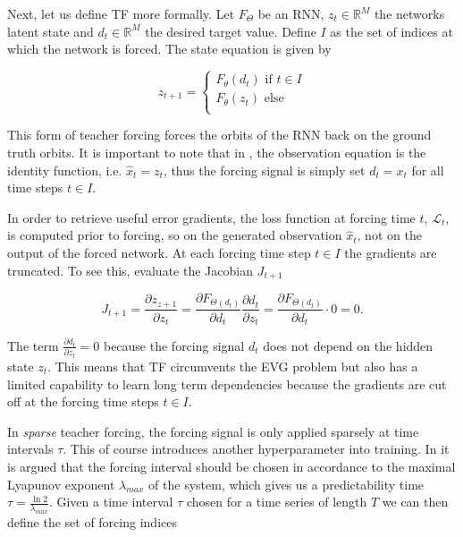 Next, let us define TF more formally. Let $F_{\Theta}$ be an RNN, $z_{t} \in \mathbb{R}^M$ the networks latent state and $d_t \in \mathbb{R}^M$ the desired 
target value. Define $I$ as the set of indices at which the network is forced. The state equation is given by

\begin{equation}
    z_{t+1} = \begin{cases}
        F_{\theta}(d_t) \text{ if } t \in I \\
        F_{\theta}(z_t) \text{ else }\\
    \end{cases}
    \label{eq:teacher_forcing}
\end{equation}

This form of teacher forcing forces the orbits of the RNN back on the ground truth orbits. It is important to note that in \cite{williams1989learning}, 
the observation equation is the identity function, i.e. $\hat{x}_t = z_t$, thus the forcing signal is simply set $d_t = x_t$ for all time steps $t \in I$. 

In order to retrieve useful error gradients, the loss function at forcing time $t$, $\mathcal{L}_t$, is computed prior to forcing,
so on the generated observation $\hat{x}_t$, not on the output of the forced network. At each forcing time step $t \in I$ the gradients are truncated.
To see this, evaluate the Jacobian $J_{t+1}$

\begin{equation}
    J_{t+1} = \frac{\partial z_{z+1}}{\partial z_{t}} = \frac{\partial F_{\Theta (d_t)}}{\partial d_t} \frac{\partial d_t}{\partial z_t} = \frac{\partial F_{\Theta (d_t)}}{\partial d_t} \cdot 0 = 0.
\end{equation}

The term $\frac{\partial d_t}{\partial z_t} = 0$ because the forcing signal $d_t$ does not depend on the hidden state $z_t$. This means that TF circumvents
the EVG problem but also has a limited capability to learn long term dependencies because the gradients are cut off at the forcing time steps $t \in I$.

In \textit{sparse} teacher forcing, the forcing signal is only applied sparsely at time intervals $\tau$. This of course introduces another hyperparameter
into training. In \cite{NEURIPS2022_495e55f3} it is argued that the forcing interval should be chosen in accordance to the maximal Lyapunov exponent
$\lambda_{max}$ of the system, which gives us a predictability time $\tau = \frac{\ln2}{\lambda_{max}}$. Given a time interval $\tau$ chosen for a 
time series of length $T$ we can then define the set of forcing indices

